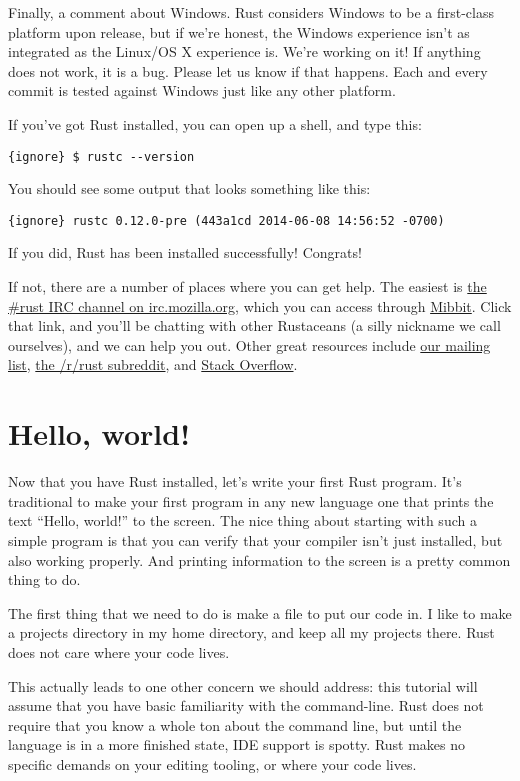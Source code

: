 \documentclass[]{article}
\begin{document}
Finally, a comment about Windows. Rust considers Windows to be a
first-class platform upon release, but if we're honest, the Windows
experience isn't as integrated as the Linux/OS X experience is. We're
working on it! If anything does not work, it is a bug. Please let us
know if that happens. Each and every commit is tested against Windows
just like any other platform.

If you've got Rust installed, you can open up a shell, and type this:

\texttt{\{ignore\} \$ rustc -\/-version}

You should see some output that looks something like this:

\texttt{\{ignore\} rustc 0.12.0-pre (443a1cd 2014-06-08 14:56:52 -0700)}

If you did, Rust has been installed successfully! Congrats!

If not, there are a number of places where you can get help. The easiest
is \href{irc://irc.mozilla.org/\#rust}{the \#rust IRC channel on
irc.mozilla.org}, which you can access through
\href{http://chat.mibbit.com/?server=irc.mozilla.org\&channel=\%23rust}{Mibbit}.
Click that link, and you'll be chatting with other Rustaceans (a silly
nickname we call ourselves), and we can help you out. Other great
resources include \href{https://mail.mozilla.org/listinfo/rust-dev}{our
mailing list}, \href{http://www.reddit.com/r/rust}{the /r/rust
subreddit}, and
\href{http://stackoverflow.com/questions/tagged/rust}{Stack Overflow}.

\section{Hello, world!}\label{hello-world}

Now that you have Rust installed, let's write your first Rust program.
It's traditional to make your first program in any new language one that
prints the text ``Hello, world!'' to the screen. The nice thing about
starting with such a simple program is that you can verify that your
compiler isn't just installed, but also working properly. And printing
information to the screen is a pretty common thing to do.

The first thing that we need to do is make a file to put our code in. I
like to make a projects directory in my home directory, and keep all my
projects there. Rust does not care where your code lives.

This actually leads to one other concern we should address: this
tutorial will assume that you have basic familiarity with the
command-line. Rust does not require that you know a whole ton about the
command line, but until the language is in a more finished state, IDE
support is spotty. Rust makes no specific demands on your editing
tooling, or where your code lives.
\end{document}
